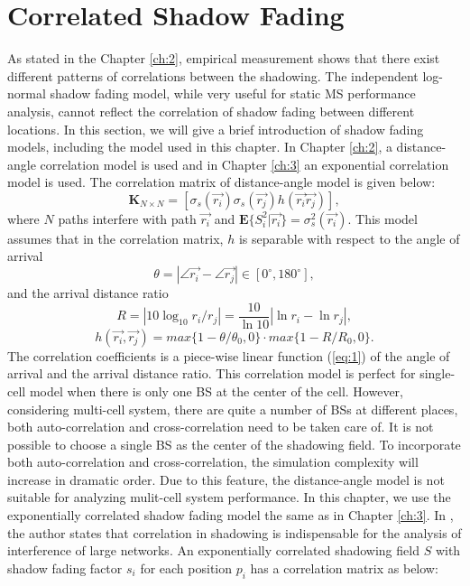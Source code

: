 \section{Correlated Shadow Fading}
\label{CorrShadowField}
As stated in the Chapter \ref{ch:2}, empirical measurement shows that there exist different patterns of correlations between the shadowing. The independent log-normal shadow fading model, while very useful for static MS performance analysis, cannot reflect the correlation of shadow fading between different locations. In this section, we will give a brief introduction of shadow fading models, including the model used in this chapter.
In Chapter \ref{ch:2}, a distance-angle correlation model is used and in Chapter \ref{ch:3} an exponential correlation model is used. The correlation matrix of distance-angle model is given below:
\begin{equation}
\mathbf{K}_{N\times N} = [ \sigma_{s}(\vec{r_{i}})\sigma_{s}(\vec{r_{j}})h(\vec{r_{i}}\vec{r_{j}})],
\label{correlationmatrix}
\end{equation}
where $N$ paths interfere with path $\vec{r_{i}}$ and $\mathbf{E}\{S_{i}^{2}|\vec{r_{i}}\}=\sigma_{s}^{2}(\vec{r_{i}})$. This model assumes that in the correlation matrix, $h$ is separable with respect to the angle of arrival
\begin{equation}
\theta = |\angle\vec{r_{i}}-\angle\vec{r_{j}}|\in [0^{\circ},180^{\circ}],
\end{equation}
and the arrival distance ratio
\begin{equation}
R=|10\log_{10}r_{i}/r_{j}|=\frac{10}{\ln 10}|\ln r_{i}-\ln r_{j}|,
\end{equation}
\begin{equation}
h(\vec{r_{i}},\vec{r_{j}})=max\{1-\theta/\theta_{0},0\}\cdot max\{1-R/R_{0},0\}.
\label{eq:1}
\end{equation}
The correlation coefficients is a piece-wise linear function (\ref{eq:1}) of the angle of arrival and the arrival distance ratio. This correlation model is perfect for single-cell model when there is only one BS at the center of the cell. However, considering multi-cell system, there are quite a number of BSs at different places, both auto-correlation and cross-correlation need to be taken care of. It is not possible to choose a single BS as the center of the shadowing field. To incorporate both auto-correlation and cross-correlation, the simulation complexity will increase in dramatic order. Due to this feature, the distance-angle model is not suitable for analyzing mulit-cell system performance. In this chapter, we use the exponentially correlated shadow fading model \cite{szyszkowicz2011interference} the same as in Chapter \ref{ch:3}. In \cite{szyszkowicz2011interference}, the author states that correlation in shadowing is indispensable for the analysis of interference of large networks. An exponentially correlated shadowing field $S$ with shadow fading factor $s_{i}$ for each position $p_{i}$ has a correlation matrix as below:
